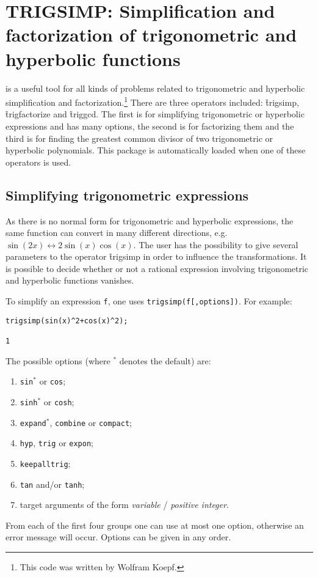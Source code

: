 \section[TRIGSIMP]{TRIGSIMP: Simplification and factorization of trigonometric
and hyperbolic functions}
\label{sec:TRIGSIMP}

 is a useful tool for all kinds of
problems related to trigonometric and hyperbolic simplification and
factorization.\footnote{This code was written by Wolfram Koepf.}  There are three operators included:
\f{trigsimp}, \f{trigfactorize} and \f{triggcd}.  The first is for simplifying
trigonometric or hyperbolic expressions and has many options, the
second is for factorizing them and the third is for finding the
greatest common divisor of two trigonometric or hyperbolic
polynomials.  This package is automatically loaded when one of these
operators is used.


\subsection{Simplifying trigonometric expressions}
\hypertarget{operator:TRIGSIMP}{}
As there is no normal form for trigonometric and hyperbolic
expressions, the same function can convert in many different
directions, e.g.\ $\sin(2x) \leftrightarrow 2\sin(x)\cos(x)$.  The
user has the possibility to give several parameters to the operator
\f{trigsimp} in order to influence the transformations.  It is
possible to decide whether or not a rational expression involving
trigonometric and hyperbolic functions vanishes.

To simplify an expression \texttt{f}, one uses
\texttt{trigsimp(f[,options])}.  For example:
\begin{verbatim}
trigsimp(sin(x)^2+cos(x)^2);

1
\end{verbatim}
The possible options (where $^*$ denotes the default) are:
\begin{enumerate}
\item \texttt{sin}$^*$ or \texttt{cos};
\item \texttt{sinh}$^*$ or \texttt{cosh};
\item \texttt{expand}$^*$, \texttt{combine} or \texttt{compact};
\item \texttt{hyp}, \texttt{trig} or \texttt{expon};
\item \texttt{keepalltrig};
\item \texttt{tan} and/or \texttt{tanh};
\item target arguments of the form \textit{variable} /
\textit{positive integer}.
\end{enumerate}
From each of the first four groups one can use at most one option,
otherwise an error message will occur.  Options can be given in any
order.

